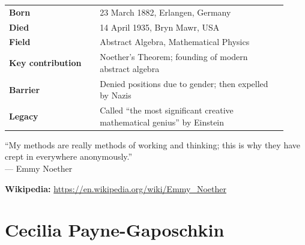 \documentclass[12pt,a4paper]{article}
\makeatletter
\newcommand{\keyfacts}[1]{%
  \begin{tcolorbox}[factbox, title={Key Facts}]
  \begin{tabular}{@{}p{0.3\linewidth}p{0.62\linewidth}@{}}
  #1
  \end{tabular}
  \end{tcolorbox}
}
\newcommand{\pullquote}[2]{%
  \begin{tcolorbox}[quotebox]
  ``#1''\\[4pt]
  {\small\normalfont\color{medgray}--- #2}
  \end{tcolorbox}
}
\makeatother
\begin{document}
\keyfacts{
\textbf{Born} & 23 March 1882, Erlangen, Germany\\[3pt]
\textbf{Died} & 14 April 1935, Bryn Mawr, USA\\[3pt]
\textbf{Field} & Abstract Algebra, Mathematical Physics\\[3pt]
\textbf{Key contribution} & Noether's Theorem; founding of modern abstract algebra\\[3pt]
\textbf{Barrier} & Denied positions due to gender; then expelled by Nazis\\[3pt]
\textbf{Legacy} & Called ``the most significant creative mathematical genius'' by Einstein\\
}

\pullquote{My methods are really methods of working and thinking; this is why they have crept in everywhere anonymously.}{Emmy Noether}

\textbf{Wikipedia:} \url{https://en.wikipedia.org/wiki/Emmy_Noether}

\newpage

\section{Cecilia Payne-Gaposchkin}
\end{document}
